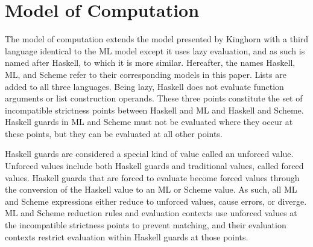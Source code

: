 \newcommand{\haskell}{Haskell model\xspace}
\newcommand{\ml}{ML model\xspace}
\newcommand{\scheme}{Scheme model\xspace}

\newcommand{\haskellml}{Haskell and ML models\xspace}
\newcommand{\haskellmlscheme}{Haskell, ML, and Scheme models\xspace}

\newcommand{\articlehaskell}[1]{#1 \haskell}
\newcommand{\articleml}[1]{#1 \ml}
\newcommand{\articlescheme}[1]{#1 \scheme}

\newcommand{\articlehaskellml}[1]{#1 \haskellml}
\newcommand{\articlehaskellmlscheme}[1]{#1 \haskellmlscheme}

\newcommand{\thehaskell}{\articlehaskell{the}}
\newcommand{\Thehaskell}{\articlehaskell{The}}
\newcommand{\theml}{\articleml{the}}
\newcommand{\Theml}{\articleml{The}}
\newcommand{\thescheme}{\articlescheme{the}}
\newcommand{\Thescheme}{\articlescheme{The}}

\newcommand{\thehaskellml}{\articlehaskellml{the}}
\newcommand{\Thehaskellml}{\articlehaskellml{The}}
\newcommand{\thehaskellmlscheme}{\articlehaskellmlscheme{the}}
\newcommand{\Thehaskellmlscheme}{\articlehaskellmlscheme{The}}

\newcommand{\hastype}[1]{has the type #1}
\newcommand{\havetype}[1]{have the type #1}

\section{Model of Computation}

The model of computation extends the model presented by Kinghorn \cite{kinghorn07} with a third language identical to the ML model except it uses lazy evaluation, and as such is named after Haskell, to which it is more similar. Hereafter, the names Haskell, ML, and Scheme refer to their corresponding models in this paper. Lists are added to all three languages. Being lazy, Haskell does not evaluate function arguments or list construction operands. These three points constitute the set of incompatible strictness points between Haskell and ML and Haskell and Scheme. Haskell guards in ML and Scheme must not be evaluated where they occur at these points, but they can be evaluated at all other points.

Haskell guards are considered a special kind of value called an unforced value. Unforced values include both Haskell guards and traditional values, called forced values. Haskell guards that are forced to evaluate become forced values through the conversion of the Haskell value to an ML or Scheme value. As such, all ML and Scheme expressions either reduce to unforced values, cause errors, or diverge. ML and Scheme reduction rules and evaluation contexts use unforced values at the incompatible strictness points to prevent matching, and their evaluation contexts restrict evaluation within Haskell guards at those points.

